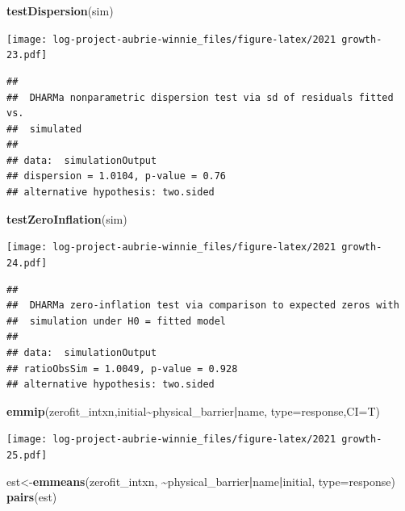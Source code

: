 \documentclass[
]{article}
\newenvironment{Shaded}{\begin{snugshade}}{\end{snugshade}}
\newcommand{\AttributeTok}[1]{\textcolor[rgb]{0.13,0.29,0.53}{#1}}
\newcommand{\FunctionTok}[1]{\textcolor[rgb]{0.13,0.29,0.53}{\textbf{#1}}}
\newcommand{\NormalTok}[1]{#1}
\newcommand{\OtherTok}[1]{\textcolor[rgb]{0.56,0.35,0.01}{#1}}
\newcommand{\SpecialCharTok}[1]{\textcolor[rgb]{0.81,0.36,0.00}{\textbf{#1}}}
\newcommand{\StringTok}[1]{\textcolor[rgb]{0.31,0.60,0.02}{#1}}
\begin{document}
\begin{Shaded}
\begin{Highlighting}[]
\FunctionTok{testDispersion}\NormalTok{(sim)}
\end{Highlighting}
\end{Shaded}

\texttt{[image: log-project-aubrie-winnie\_files/figure-latex/2021 growth-23.pdf]}

\begin{verbatim}
## 
##  DHARMa nonparametric dispersion test via sd of residuals fitted vs.
##  simulated
## 
## data:  simulationOutput
## dispersion = 1.0104, p-value = 0.76
## alternative hypothesis: two.sided
\end{verbatim}

\begin{Shaded}
\begin{Highlighting}[]
\FunctionTok{testZeroInflation}\NormalTok{(sim)}
\end{Highlighting}
\end{Shaded}

\texttt{[image: log-project-aubrie-winnie\_files/figure-latex/2021 growth-24.pdf]}

\begin{verbatim}
## 
##  DHARMa zero-inflation test via comparison to expected zeros with
##  simulation under H0 = fitted model
## 
## data:  simulationOutput
## ratioObsSim = 1.0049, p-value = 0.928
## alternative hypothesis: two.sided
\end{verbatim}

\begin{Shaded}
\begin{Highlighting}[]
\FunctionTok{emmip}\NormalTok{(zerofit\_intxn,initial}\SpecialCharTok{\textasciitilde{}}\NormalTok{physical\_barrier}\SpecialCharTok{|}\NormalTok{name, }\AttributeTok{type=}\StringTok{\textquotesingle{}response\textquotesingle{}}\NormalTok{,}\AttributeTok{CI=}\NormalTok{T)}
\end{Highlighting}
\end{Shaded}

\texttt{[image: log-project-aubrie-winnie\_files/figure-latex/2021 growth-25.pdf]}

\begin{Shaded}
\begin{Highlighting}[]
\NormalTok{est}\OtherTok{\textless{}{-}}\FunctionTok{emmeans}\NormalTok{(zerofit\_intxn, }\SpecialCharTok{\textasciitilde{}}\NormalTok{physical\_barrier}\SpecialCharTok{|}\NormalTok{name}\SpecialCharTok{|}\NormalTok{initial, }\AttributeTok{type=}\StringTok{\textquotesingle{}response\textquotesingle{}}\NormalTok{)}
\FunctionTok{pairs}\NormalTok{(est)}
\end{Highlighting}
\end{Shaded}
\end{document}
